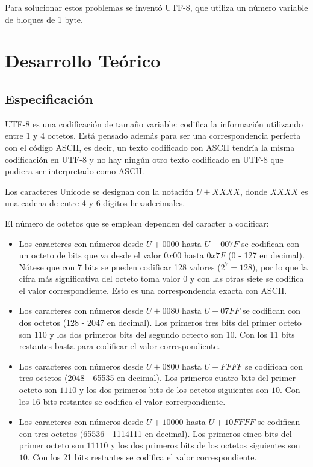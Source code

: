 \documentclass{article}
\begin{document}
Para solucionar estos problemas se inventó UTF-8, que utiliza un número variable
de bloques de 1 byte.

\section{Desarrollo Teórico}

\subsection{Especificación}
UTF-8 es una codificación de tamaño variable: codifica la información utilizando
entre 1 y 4 octetos. Está pensado además para ser una correspondencia perfecta
con el código ASCII, es decir, un texto codificado con ASCII tendría la misma
codificación en UTF-8 y no hay ningún otro texto codificado en UTF-8 que pudiera
ser interpretado como ASCII.

Los caracteres Unicode se designan con la notación $U+XXXX$, donde $XXXX$ es una
cadena de entre 4 y 6 dígitos hexadecimales.

El número de octetos que se emplean dependen del caracter a codificar:

\begin{itemize}
  \item Los caracteres con números desde $U+0000$ hasta $U+007F$ se codifican
        con un octeto de bits que va desde el valor $0x00$ hasta $0x7F$ (0 - 127 en
        decimal). Nótese que con 7 bits se pueden codificar 128 valores ($2^7 = 128$),
        por lo que la cifra más significativa del octeto toma valor 0 y con las otras
        siete se codifica el valor correspondiente. Esto es una correspondencia exacta
        con ASCII.
  \item Los caracteres con números desde $U+0080$ hasta $U+07FF$ se codifican
        con dos octetos (128 - 2047 en decimal). Los primeros tres bits del primer
        octeto son $110$ y los dos primeros bits del segundo octecto son $10$. Con los
        11 bits restantes basta para codificar el valor correspondiente.
  \item Los caracteres con números desde $U+0800$ hasta $U+FFFF$ se codifican
        con tres octetos (2048 - 65535 en decimal). Los primeros cuatro bits del
        primer octeto son $1110$ y los dos primeros bits de los octetos siguientes son
        $10$. Con los 16 bits restantes se codifica el valor correspondiente.
  \item Los caracteres con números desde $U+10000$ hasta $U+10FFFF$ se codifican
        con tres octetos (65536 - 1114111 en decimal). Los primeros cinco bits del
        primer octeto son $11110$ y los dos primeros bits de los octetos siguientes
        son $10$. Con los 21 bits restantes se codifica el valor correspondiente.
\end{itemize}
\end{document}
